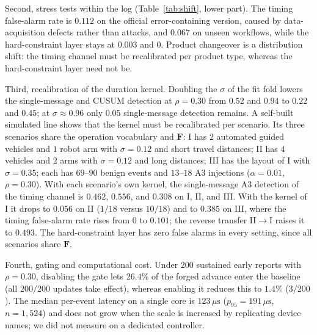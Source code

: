 \documentclass[manuscript,screen,review]{acmart}
\begin{document}
Second, stress tests within the log (Table~\ref{tab:shift}, lower part). The timing false-alarm rate is $0.112$ on the official error-containing version, caused by data-acquisition defects rather than attacks, and $0.067$ on unseen workflows, while the hard-constraint layer stays at $0.003$ and $0$. Product changeover is a distribution shift: the timing channel must be recalibrated per product type, whereas the hard-constraint layer need not be.

Third, recalibration of the duration kernel. Doubling the $\sigma$ of the fit fold lowers the single-message and {CUSUM} detection at $\rho=0.30$ from $0.52$ and $0.94$ to $0.22$ and $0.45$; at $\sigma\approx0.96$ only $0.05$ single-message detection remains. A self-built simulated line shows that the kernel must be recalibrated per scenario. Its three scenarios share the operation vocabulary and $\mathbf F$: I has $2$ automated guided vehicles and $1$ robot arm with $\sigma=0.12$ and short travel distances; II has $4$ vehicles and $2$ arms with $\sigma=0.12$ and long distances; III has the layout of I with $\sigma=0.35$; each has $69$--$90$ benign events and $13$--$18$ {A3} injections ($\alpha=0.01$, $\rho=0.30$). With each scenario's own kernel, the single-message {A3} detection of the timing channel is $0.462$, $0.556$, and $0.308$ on I, II, and III. With the kernel of I it drops to $0.056$ on II ($1/18$ versus $10/18$) and to $0.385$ on III, where the timing false-alarm rate rises from $0$ to $0.101$; the reverse transfer II$\to$I raises it to $0.493$. The hard-constraint layer has zero false alarms in every setting, since all scenarios share $\mathbf F$.

Fourth, gating and computational cost. Under $200$ sustained early reports with $\rho=0.30$, disabling the gate lets $26.4\%$ of the forged advance enter the baseline (all $200/200$ updates take effect), whereas enabling it reduces this to $1.4\%$ ($3/200$). The median per-event latency on a single core is $123\,\mu\mathrm{s}$ ($p_{95}=191\,\mu\mathrm{s}$, $n=1{,}524$) and does not grow when the scale is increased by replicating device names; we did not measure on a dedicated controller.
\end{document}
